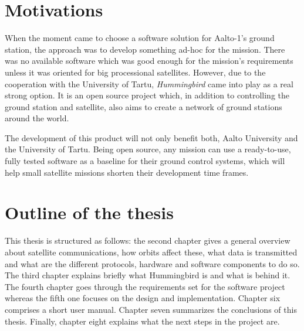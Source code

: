 \section{Motivations}

When the moment came to choose a software solution for Aalto-1's ground station, the approach was to develop something ad-hoc for the mission. There was no available software which was good enough for the mission's requirements unless it was oriented for big processional satellites. However, due to the cooperation with the University of Tartu, \emph{Hummingbird} came into play as a real strong option. It is an open source project which, in addition to controlling the ground station and satellite, also aims to create a network of ground stations around the world. 

The development of this product will not only benefit both, Aalto University and the University of Tartu. Being open source, any mission can use a ready-to-use, fully tested software as a baseline for their ground control systems, which will help small satellite missions shorten their development time frames. 

\pagebreak
\section{Outline of the thesis}
This thesis is structured as follows: the second chapter gives a general overview about satellite communications, how orbits affect these, what data is transmitted and what are the different protocols, hardware and software components to do so. The third chapter explains briefly what Hummingbird is and what is behind it. The fourth chapter goes through the requirements set for the software project whereas the fifth one focuses on the design and implementation. Chapter six comprises a short user manual. Chapter seven summarizes the conclusions of this thesis. Finally, chapter eight explains what the next steps in the project are.

\newpage
